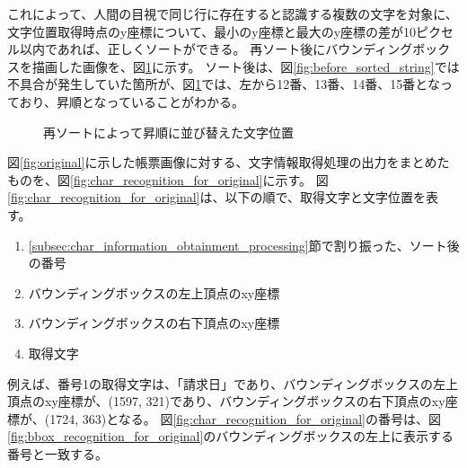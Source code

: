 これによって、人間の目視で同じ行に存在すると認識する複数の文字を対象に、文字位置取得時点のy座標について、最小のy座標と最大のy座標の差が10ピクセル以内であれば、正しくソートができる。
再ソート後にバウンディングボックスを描画した画像を、図\ref{fig:after_sorted_string}に示す。
ソート後は、図\ref{fig:before_sorted_string}では不具合が発生していた箇所が、図\ref{fig:after_sorted_string}では、左から12番、13番、14番、15番となっており、昇順となっていることがわかる。

\begin{figure}[t]
    \begin{center}
        \caption{再ソートによって昇順に並び替えた文字位置}
        \label{fig:after_sorted_string}
    \end{center}
\end{figure}

図\ref{fig:original}に示した帳票画像に対する、文字情報取得処理の出力をまとめたものを、図\ref{fig:char_recognition_for_original}に示す。
図\ref{fig:char_recognition_for_original}は、以下の順で、取得文字と文字位置を表す。

\begin{enumerate}
    \item \ref{subsec:char_information_obtainment_processing}節で割り振った、ソート後の番号
    \item バウンディングボックスの左上頂点のxy座標
    \item バウンディングボックスの右下頂点のxy座標
    \item 取得文字
\end{enumerate}

例えば、番号1の取得文字は、「請求日」であり、バウンディングボックスの左上頂点のxy座標が、(1597, 321)であり、バウンディングボックスの右下頂点のxy座標が、(1724, 363)となる。
図\ref{fig:char_recognition_for_original}の番号は、図\ref{fig:bbox_recognition_for_original}のバウンディングボックスの左上に表示する番号と一致する。

